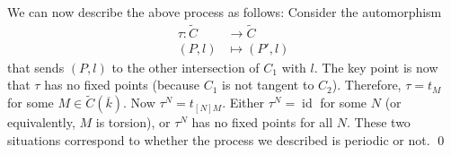 We can now describe the above process as follows:
Consider the automorphism
\begin{align*}
  \tau \colon \widetilde{C} & \to \widetilde{C} \\
  (P,l) & \mapsto (P',l)
\end{align*}
that sends \( (P,l) \) to the other intersection of \( C_1 \) with \( l \).
The key point is now that \( \tau \) has no fixed points (because \( C_1 \) is not tangent to \( C_2 \)).
Therefore, \( \tau = t_{M} \) for some \( M \in \widetilde{C}(\overline{k}) \).
Now \( \tau^N = t_{[N]M} \). Either \( \tau^N = \operatorname{id} \) for some \( N \) (or equivalently, \( M \) is torsion), or \( \tau^N \) has no fixed points for all \( N \).
These two situations correspond to whether the process we described is periodic or not. \qed

